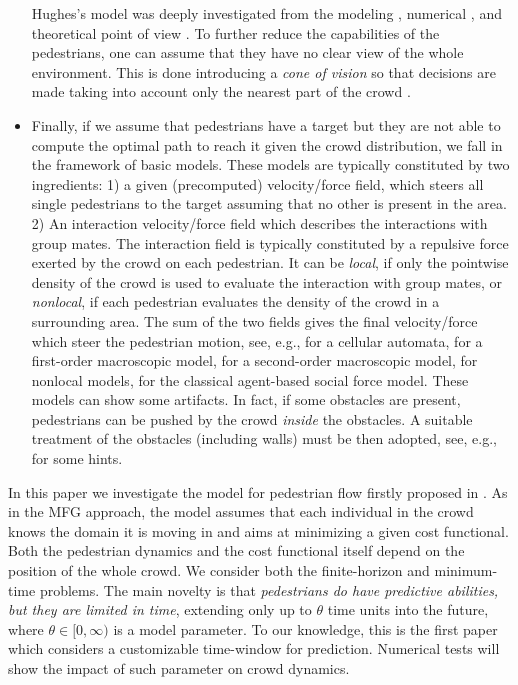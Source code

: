 \documentclass{cmslatex}
\begin{document}
\begin{itemize}[leftmargin=*]
	Hughes's model was deeply investigated from the modeling \cite{burger2014, jiang2009, twarogowska2014}, numerical \cite{carlini2017}, and theoretical point of view \cite{amadori2012, camilli2017, difrancesco2011, eftimie2018, elkhatib2013, goatin2013}.  
    To further reduce the capabilities of the pedestrians, one can assume that they have no clear view of the whole environment. This is done introducing a \emph{cone of vision} so that decisions are made taking into account only the nearest part of the crowd \cite{carrillo2016}.	
	\item Finally, if we assume that pedestrians have a target but they are not able to compute the optimal path to reach it given the crowd distribution, we fall in the framework of basic models. These models are typically constituted by two ingredients: 1) a given (precomputed) velocity/force field, which steers all single pedestrians to the target assuming that no other is present in the area. 2) An interaction velocity/force field which describes the interactions with group mates.
	The interaction field is typically constituted by a repulsive force exerted by the crowd on each pedestrian. It can be \emph{local}, if only the pointwise density of the crowd is used to evaluate the interaction with group mates, or \emph{nonlocal}, if each pedestrian evaluates the density of the crowd in a surrounding area. The sum of the two fields gives the final velocity/force which steer the pedestrian motion, see, e.g., \cite{burstedde2001} for a cellular automata, \cite{coscia2008} for a first-order macroscopic model, \cite{bellomo2011} for a second-order macroscopic model, \cite{colombo2012, cristiani2011} for nonlocal models, \cite{helbing1991, helbing2000, helbing1995} for the classical agent-based social force model.
	These models can show some artifacts. In fact, if some obstacles are present, pedestrians can be pushed by the crowd \emph{inside} the obstacles. A suitable treatment of the obstacles (including walls) must be then adopted, see, e.g., \cite{cristiani2017} for some hints. 
\end{itemize}

\medskip

In this paper we investigate the model for pedestrian flow firstly proposed in \cite{cristiani2015SIAP}. As in the MFG approach, the model assumes that each individual in the crowd knows the domain it is moving in and aims at minimizing a given cost functional. 
Both the pedestrian dynamics and the cost functional itself depend on the position of the whole crowd. 
We consider both the finite-horizon and minimum-time problems. 
The main novelty is that \textit{pedestrians do have predictive abilities, but they are limited in time}, extending only up to $\theta$ time units into the future, where $\theta\in[0,\infty)$ is a model parameter. 
To our knowledge, this is the first paper which considers a customizable time-window for prediction. 
Numerical tests will show the impact of such parameter on crowd dynamics.
\end{document}
